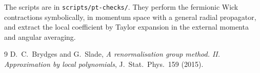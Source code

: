 \documentclass[11pt]{amsart}
\theoremstyle{definition}
\theoremstyle{remark}
\numberwithin{equation}{section}
\begin{document}
The scripts are in \texttt{scripts/pt-checks/}. They perform the fermionic Wick contractions
symbolically, in momentum space with a general radial propagator, and extract the local
coefficient by Taylor expansion in the external momenta and angular averaging.

\begin{thebibliography}{9}
 D.~C.~Brydges and G.~Slade, \emph{A renormalisation group method. II.
Approximation by local polynomials}, J.\ Stat.\ Phys.\ 159 (2015).
\end{thebibliography}
\end{document}
